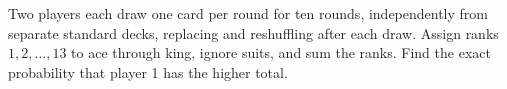 Two players each draw one card per round for ten rounds, independently from separate standard decks, replacing and reshuffling after each draw. Assign ranks $1,2,\ldots,13$ to ace through king, ignore suits, and sum the ranks. Find the exact probability that player 1 has the higher total.
